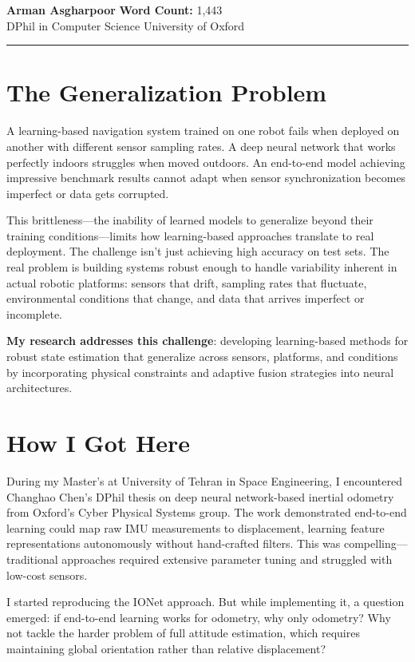 \documentclass[12pt]{article}
\begin{document}
\vspace{-0.3cm}
{\Large\textbf{Arman Asgharpoor}} \hfill \textbf{Word Count:} 1,443\\
DPhil in Computer Science \hfill University of Oxford
\rule[-0.2em]{\textwidth}{1pt}

\section*{The Generalization Problem}

A learning-based navigation system trained on one robot fails when deployed on another with different sensor sampling rates. A deep neural network that works perfectly indoors struggles when moved outdoors. An end-to-end model achieving impressive benchmark results cannot adapt when sensor synchronization becomes imperfect or data gets corrupted.

This brittleness—the inability of learned models to generalize beyond their training conditions—limits how learning-based approaches translate to real deployment. The challenge isn't just achieving high accuracy on test sets. The real problem is building systems robust enough to handle variability inherent in actual robotic platforms: sensors that drift, sampling rates that fluctuate, environmental conditions that change, and data that arrives imperfect or incomplete.

\textbf{My research addresses this challenge}: developing learning-based methods for robust state estimation that generalize across sensors, platforms, and conditions by incorporating physical constraints and adaptive fusion strategies into neural architectures.

\section*{How I Got Here}

During my Master's at University of Tehran in Space Engineering, I encountered Changhao Chen's DPhil thesis on deep neural network-based inertial odometry from Oxford's Cyber Physical Systems group. The work demonstrated end-to-end learning could map raw IMU measurements to displacement, learning feature representations autonomously without hand-crafted filters. This was compelling—traditional approaches required extensive parameter tuning and struggled with low-cost sensors.

I started reproducing the IONet approach. But while implementing it, a question emerged: if end-to-end learning works for odometry, why only odometry? Why not tackle the harder problem of full attitude estimation, which requires maintaining global orientation rather than relative displacement?
\end{document}
